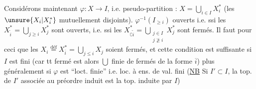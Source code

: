 Considérons maintenant $\varphi:X\longrightarrow I$, i.e.  pseudo-partition : $X=\bigcup_{i\in I}X_i^*$
(les $\unsure{X_i|X_i^*}$ mutuellement disjoints).  
$\varphi^{-1}(I_{\geq i})$ ouverts
 i.e. ssi les $X_{\widetilde i}^*=\bigcup_{j\geq i}X_j^*$ sont ouverts, i.e. ssi les
$X_{\complement\widetilde i}^*=\bigcup_{\substack{j\in I\\j\not\geq i}}X_j^*$
sont fermés. Il faut pour ceci que les
$X_i\overset{\mathrm{déf}}=X_{\overline i}^*=\bigcup_{j\leq i}X_j$
soient fermés, et cette condition est suffisante
si $I$ est fini (car tt fermé  est alors $\bigcup$ finie de fermés de la forme $\overline i$)
plus généralement si $\varphi$ est ``loct. finie'' i.e. loc. à ens. de val. fini
(\uline{NB} Si $I'\subset I$, la top. de $I'$ associée au préordre induit est la top. induite
par $I$)



